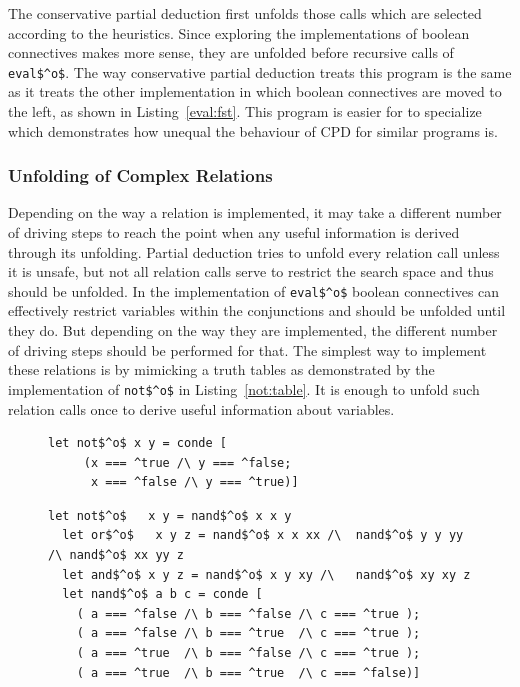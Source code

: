 The conservative partial deduction first unfolds those calls which are selected according to the heuristics.
Since exploring the implementations of boolean connectives makes more sense, they are unfolded before recursive calls of \lstinline{eval$^o$}.
The way conservative partial deduction treats this program is the same as it treats the other implementation in which boolean connectives
are moved to the left, as shown in Listing~\ref{eval:fst}.
This program is easier for \ecce to specialize which demonstrates how unequal the behaviour of CPD for similar programs is.

\subsubsection{Unfolding of Complex Relations}

Depending on the way a relation is implemented, it may take a different number of driving steps to reach the point when any useful information is derived through its unfolding.
Partial deduction tries to unfold every relation call unless it is unsafe, but not all relation calls serve to restrict the search space and thus should be unfolded.
In the implementation of \lstinline{eval$^o$} boolean connectives can effectively restrict variables within the conjunctions and should be unfolded until they do.
But depending on the way they are implemented, the different number of driving steps should be performed for that.
The simplest way to implement these relations is by mimicking a truth tables as demonstrated by the implementation of \lstinline{not$^o$} in Listing~\ref{not:table}.
It is enough to unfold such relation calls once to derive useful information about variables.

\begin{figure}[!t]
  \centering
  \begin{minipage}{0.5\textwidth}
    \begin{lstlisting}[label={not:table}, caption={Implementation of boolean \lstinline{not} as a table}, captionpos=b, frame=tb]
  let not$^o$ x y = conde [
     (x === ^true /\ y === ^false;
      x === ^false /\ y === ^true)]
    \end{lstlisting}
  \end{minipage}
  \begin{minipage}{0.8\textwidth}
    \begin{lstlisting}[label={not:nando}, caption={Implementation of boolean operation via \lstinline{nand}}, captionpos=b, frame=tb]
  let not$^o$   x y = nand$^o$ x x y
  let or$^o$   x y z = nand$^o$ x x xx /\  nand$^o$ y y yy /\ nand$^o$ xx yy z
  let and$^o$ x y z = nand$^o$ x y xy /\   nand$^o$ xy xy z
  let nand$^o$ a b c = conde [
    ( a === ^false /\ b === ^false /\ c === ^true );
    ( a === ^false /\ b === ^true  /\ c === ^true );
    ( a === ^true  /\ b === ^false /\ c === ^true );
    ( a === ^true  /\ b === ^true  /\ c === ^false)]
    \end{lstlisting}
  \end{minipage}
\end{figure}

